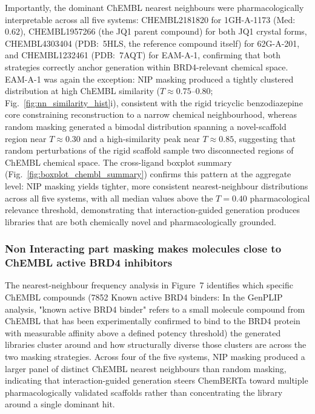 \documentclass[a4paper,12pt]{article}
\begin{document}
Importantly, the dominant ChEMBL nearest neighbours were
pharmacologically interpretable across all five systems:
CHEMBL2181820 for 1GH-A-1173 (Med:~$0.62$),
CHEMBL1957266 (the JQ1 parent compound) for both JQ1 crystal forms,
CHEMBL4303404 (PDB:~5HLS, the reference compound itself) for
62G-A-201, and CHEMBL1232461 (PDB:~7AQT) for EAM-A-1, confirming
that both strategies correctly anchor generation within BRD4-relevant
chemical space.
EAM-A-1 was again the exception: NIP masking produced a tightly
clustered distribution at high ChEMBL similarity
($T \approx 0.75$--$0.80$; Fig.~\ref{fig:nn_similarity_hist}i),
consistent with the rigid tricyclic benzodiazepine core constraining
reconstruction to a narrow chemical neighbourhood, whereas random
masking generated a bimodal distribution spanning a novel-scaffold
region near $T \approx 0.30$ and a high-similarity peak near
$T \approx 0.85$, suggesting that random perturbations of the rigid
scaffold sample two disconnected regions of ChEMBL chemical space.
The cross-ligand boxplot summary (Fig.~\ref{fig:boxplot_chembl_summary})
confirms this pattern at the aggregate level: NIP masking yields
tighter, more consistent nearest-neighbour distributions across all
five systems, with all median values above the $T = 0.40$
pharmacological relevance threshold, demonstrating that
interaction-guided generation produces libraries that are both
chemically novel and pharmacologically grounded.

\subsubsection{Non Interacting part masking makes molecules close to ChEMBL active BRD4 inhibitors}


The nearest-neighbour frequency analysis in Figure~7 identifies which specific ChEMBL compounds (7852 Known active BRD4 binders: In the GenPLIP analysis, "known active BRD4 binder" refers to a small molecule compound from ChEMBL that has been experimentally confirmed to bind to the BRD4 protein with measurable affinity above a defined potency threshold) the generated libraries cluster around and how structurally diverse those clusters are across the two masking strategies.  Across four of the five systems, NIP masking produced a larger panel of
distinct ChEMBL nearest neighbours than random masking, indicating that interaction-guided generation steers ChemBERTa toward multiple
pharmacologically validated scaffolds rather than concentrating the
library around a single dominant hit.
\end{document}
